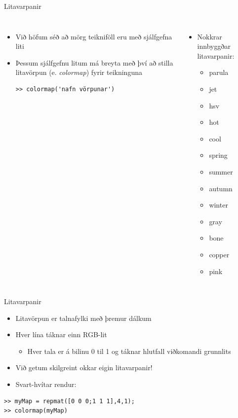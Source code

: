 \documentclass[handout]{beamer}
\begin{document}
\begin{frame}[fragile]{Litavarpanir}
\begin{columns}
\begin{itemize}
 \item Við höfum séð að mörg teikniföll eru með sjálfgefna liti
 \item Þessum sjálfgefnu litum má breyta með því að stilla litavörpun (e. \emph{colormap}) fyrir teikninguna
\begin{verbatim}
>> colormap('nafn vörpunar')
\end{verbatim}
\end{itemize}
\begin{itemize}
 \item Nokkrar innbyggðar litavarpanir:
 \begin{itemize}
  \item parula
  \item jet
  \item hsv
  \item hot
  \item cool
  \item spring
  \item summer
  \item autumn
  \item winter
  \item gray
  \item bone
  \item copper
  \item pink
 \end{itemize}
\end{itemize}
\end{columns}
\end{frame}

\begin{frame}[fragile]{Litavarpanir}
\begin{itemize}
 \item Litavörpun er talnafylki með þremur dálkum
 \item Hver lína táknar einn RGB-lit
 \begin{itemize}
  \item Hver tala er á bilinu 0 til 1 og táknar hlutfall viðkomandi grunnlits
 \end{itemize}
 \item Við getum skilgreint okkar eigin litavarpanir!
 \item Svart-hvítar rendur:
\end{itemize}
\begin{verbatim}
>> myMap = repmat([0 0 0;1 1 1],4,1);
>> colormap(myMap)
\end{verbatim}
\end{frame}
\end{document}
